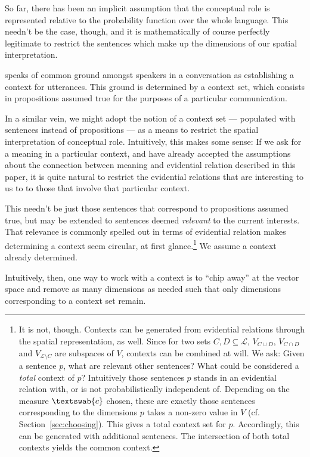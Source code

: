 \documentclass[11pt, a4paper]{scrartcl}
\renewcommand{\i}[1]{\emph{#1}}
\renewcommand{\L}{\mathcal{L}}
\newcommand{\m}[1]{\textswab{#1}}
\begin{document}
So far, there has been an implicit assumption that the conceptual role is represented relative to the probability function over the whole language. This needn't be the case, though, and it is mathematically of course perfectly legitimate to restrict the sentences which make up the dimensions of our spatial interpretation. 

\textcite{Stalnaker1978-STAA-2} speaks of common ground amongst speakers in a conversation as establishing a context for utterances. This ground is determined by a context set, which consists in propositions assumed true for the purposes of a particular communication.

In a similar vein, we might adopt the notion of a context set --- populated with sentences instead of propositions --- as a means to restrict the spatial interpretation of conceptual role. Intuitively, this makes some sense: If we ask for a meaning in a particular context, and have already accepted the assumptions about the connection between meaning and evidential relation described in this paper, it is quite natural to restrict the evidential relations that are interesting to us to to those that involve that particular context.

This needn't be just those sentences that correspond to propositions assumed true, but may be extended to sentences deemed \i{relevant} to the current interests. That relevance is commonly spelled out in terms of evidential relation makes determining a context seem circular, at first glance.\footnote{It is not, though. Contexts can be generated from evidential relations through the spatial representation, as well. Since for two sets $C, D \subseteq \L$, $V_{C\cup D}$, $V_{C\cap D}$ and $V_{\L\setminus C}$ are subspaces of $V$, contexts can be combined at will. We ask: Given a sentence $p$, what are relevant other sentences? What could be considered a \i{total} context of $p$? Intuitively those sentences $p$ stands in an evidential relation with, or is not probabilistically independent of. Depending on the measure $\m{c}$ chosen, these are exactly those sentences corresponding to the dimensions $p$ takes a non-zero value in $V$ (cf. Section~\ref{sec:choosing}). This gives a total context set for $p$. Accordingly, this can be generated with additional sentences. The intersection of both total contexts yields the common context.} We assume a context already determined.

Intuitively, then, one way to work with a context is to ``chip away'' at the vector space and remove as many dimensions as needed such that only dimensions corresponding to a context set remain.
\end{document}
